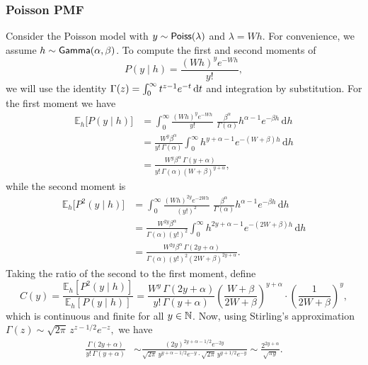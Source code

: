 \subsubsection{Poisson PMF}

Consider the Poisson model with  $y \sim {\sf{Poiss}}(\lambda)$ and $\lambda = W h$.
For convenience, we assume $h \sim {\sf{Gamma}}(\alpha, \beta)$.
To compute the first and second moments of 
\[
  P(y\mid h) = \frac{(W h)^{y} e^{-W h}}{y!},
\]
we will use the identity
$\Gamma(z) = \int_0^\infty t^{z-1} e^{-t} \, \d t$ and integration by substitution.
For the first moment we have 
\begin{align}
\mathbb{E}_{h}\bigl[P(y\mid h)\bigr]
  &= \int_{0}^{\infty} \frac{(W h)^{y} e^{-W h}}{y!}
     \;\frac{\beta^{\alpha}}{\Gamma(\alpha)} h^{\alpha-1} e^{-\beta h} \, \mathrm{d}h\\[6pt]
  &= \frac{W^{y} \beta^{\alpha}}{y!\,\Gamma(\alpha)}
     \int_{0}^{\infty} h^{y+\alpha-1} e^{-(W+\beta)h} \, \mathrm{d}h\\[6pt]
  &= \frac{W^{y} \beta^{\alpha}\,\Gamma(y+\alpha)}{y!\,\Gamma(\alpha)(W+\beta)^{y+\alpha}},
\end{align}
while the second moment is 
\begin{align}
\mathbb{E}_{h}\bigl[P^{2}(y\mid h)\bigr]
  &= \int_{0}^{\infty} \frac{(W h)^{2y} e^{-2 W h}}{(y!)^{2}}
     \;\frac{\beta^{\alpha}}{\Gamma(\alpha)} h^{\alpha-1} e^{-\beta h} \, \mathrm{d}h\\[6pt]
  &= \frac{W^{2y} \beta^{\alpha}}{\Gamma(\alpha)(y!)^{2}}
     \int_{0}^{\infty} h^{2y+\alpha-1} e^{-(2W+\beta)h} \, \mathrm{d}h\\[6pt]
  &= \frac{W^{2y} \beta^{\alpha}\, \Gamma(2y+\alpha)}{\Gamma(\alpha)(y!)^{2}(2W+\beta)^{2y+\alpha}}.
\end{align}
% 
Taking the ratio of the second to the first moment, define 
\[
  C(y) = \frac{\mathbb{E}_{h}[P^{2}(y\mid h)]}{\mathbb{E}_{h}[P(y\mid h)]}
         = \frac{W^{y} \, \Gamma(2y+\alpha)}{y!\,\Gamma(y+\alpha)}
           \left(\frac{W+\beta}{2W+\beta}\right)^{y+\alpha}
           \cdot\left(\frac{1}{2W+\beta}\right)^{y},
\]
which is continuous and finite for all $y \in \mathbb{N}$. 
Now, using Stirling's approximation
$ \Gamma(z) \sim \sqrt{2\pi}\, z^{z-1/2} e^{-z},$ we have
\begin{align}
    \frac{\Gamma(2y+\alpha)}{y!\,\Gamma(y+\alpha)} &\sim
    \frac{(2y)^{2y+\alpha-1/2} e^{-2y}}{\sqrt{2\pi}\,y^{y+\alpha-1/2} e^{-y}\cdot \sqrt{2\pi}\,y^{y+1/2} e^{-y}}
    \sim \frac{2^{2y+\alpha}}{\sqrt{\pi y}}.
\end{align}
